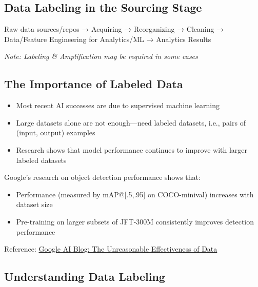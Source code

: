 \documentclass[12pt]{article}
\begin{document}
\subsection{Data Labeling in the Sourcing Stage}

\begin{tcolorbox}[colback=green!5!white,colframe=green!75!black,title={Sourcing Process Flow}]
Raw data sources/repos → Acquiring → Reorganizing → Cleaning → Data/Feature Engineering for Analytics/ML → Analytics Results

\textit{Note: Labeling \& Amplification may be required in some cases}
\end{tcolorbox}

\subsection{The Importance of Labeled Data}

\begin{tcolorbox}[colback=yellow!5!white,colframe=yellow!75!black,title={Key Insight}]
\begin{itemize}
    \item Most recent AI successes are due to supervised machine learning
    \item Large datasets alone are not enough—need labeled datasets, i.e., pairs of (input, output) examples
    \item Research shows that model performance continues to improve with larger labeled datasets
\end{itemize}
\end{tcolorbox}

\begin{tcolorbox}[colback=blue!5!white,colframe=blue!75!black,title={Research Example}]
Google's research on object detection performance shows that:
\begin{itemize}
    \item Performance (measured by mAP@[.5,.95] on COCO-minival) increases with dataset size
    \item Pre-training on larger subsets of JFT-300M consistently improves detection performance
\end{itemize}
Reference: \href{https://ai.googleblog.com/2017/07/revisiting-unreasonable-effectiveness.html}{Google AI Blog: The Unreasonable Effectiveness of Data}
\end{tcolorbox}

\subsection{Understanding Data Labeling}
\end{document}
